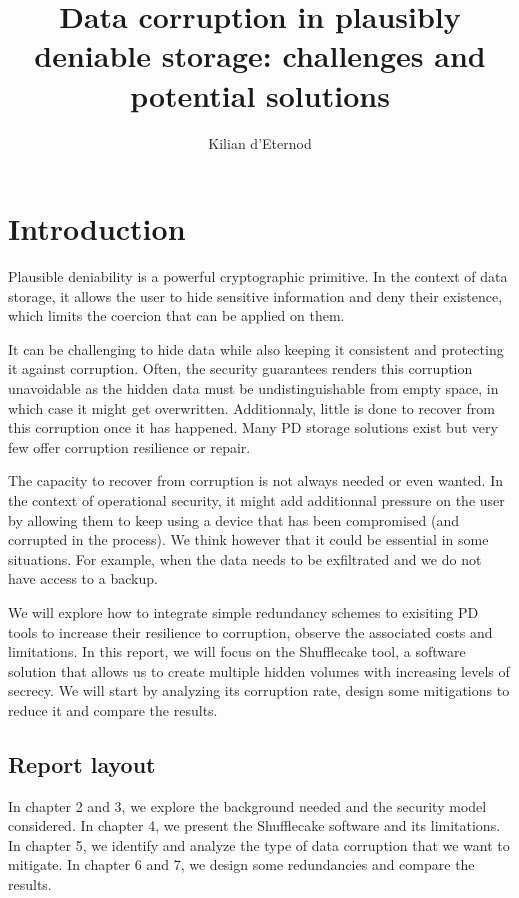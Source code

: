 \documentclass[a4paper,11pt,oneside]{report}
\title{Data corruption in plausibly deniable storage: challenges and potential solutions}
\author{Kilian d'Eternod}
\begin{document}
\maketitle
\makeacks

\maketoc

\chapter{Introduction}

Plausible deniability is a powerful cryptographic primitive. In the context of data storage, it allows the user to hide sensitive information and deny their existence, which limits the coercion that can be applied on them.

It can be challenging to hide data while also keeping it consistent and protecting it against corruption. Often, the security guarantees renders this corruption unavoidable as the hidden data must be undistinguishable from empty space, in which case it might get overwritten. Additionnaly, little is done to recover from this corruption once it has happened. Many PD storage solutions exist but very few offer corruption resilience or repair.

The capacity to recover from corruption is not always needed or even wanted. In the context of operational security, it might add additionnal pressure on the user by allowing them to keep using a device that has been compromised (and corrupted in the process). We think however that it could be essential in some situations. For example, when the data needs to be exfiltrated and we do not have access to a backup.

We will explore how to integrate simple redundancy schemes to exisiting PD tools to increase their resilience to corruption, observe the associated costs and limitations. In this report, we will focus on the Shufflecake tool, a software solution that allows us to create multiple hidden volumes with increasing levels of secrecy. We will start by analyzing its corruption rate, design some mitigations to reduce it and compare the results.

\section{Report layout}

In chapter 2 and 3, we explore the background needed and the security model considered. In chapter 4, we  present the Shufflecake software and its limitations. In chapter 5, we identify and analyze the type of data corruption that we want to mitigate. In chapter 6 and 7, we design some redundancies and compare the results.
\end{document}
